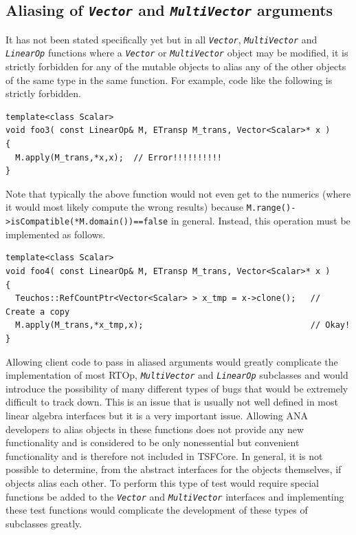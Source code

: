 %
\subsection{Aliasing of {}\texttt{\textit{Vector}} and {}\texttt{\textit{Multi\-Vector}} arguments}
\label{tsfcore:sec:aliasing}
%

It has not been stated specifically yet but in all
{}\texttt{\textit{Vector}}, {}\texttt{\textit{Multi\-Vector}} and
{}\texttt{\textit{LinearOp}} functions where a
{}\texttt{\textit{Vector}} or {}\texttt{\textit{Multi\-Vector}} object
may be modified, it is strictly forbidden for any of the mutable
objects to alias any of the other objects of the same type in the same
function.  For example, code like the following is strictly forbidden.

{\scriptsize\begin{verbatim}
template<class Scalar>
void foo3( const LinearOp& M, ETransp M_trans, Vector<Scalar>* x )
{
  M.apply(M_trans,*x,x);  // Error!!!!!!!!!!
}
\end{verbatim}}

{}\noindent{}Note that typically the above function would not even get
to the numerics (where it would most likely compute the wrong results)
because {}\texttt{M.range()->isCompatible(*M.domain())==false} in
general.  Instead, this operation must be implemented as follows.

{\scriptsize\begin{verbatim}
template<class Scalar>
void foo4( const LinearOp& M, ETransp M_trans, Vector<Scalar>* x )
{
  Teuchos::RefCountPtr<Vector<Scalar> > x_tmp = x->clone();   // Create a copy
  M.apply(M_trans,*x_tmp,x);                                  // Okay!
}
\end{verbatim}}

{}\noindent{}Allowing client code to pass in aliased arguments would
greatly complicate the implementation of most RTOp,
{}\texttt{\textit{Multi\-Vector}} and {}\texttt{\textit{LinearOp}}
subclasses and would introduce the possibility of many different types
of bugs that would be extremely difficult to track down.  This is an
issue that is usually not well defined in most linear algebra
interfaces but it is a very important issue.  Allowing ANA developers
to alias objects in these functions does not provide any new
functionality and is considered to be only nonessential but convenient
functionality and is therefore not included in TSFCore.  In general,
it is not possible to determine, from the abstract interfaces for the
objects themselves, if objects alias each other.  To perform this type
of test would require special functions be added to the
{}\texttt{\textit{Vector}} and {}\texttt{\textit{Multi\-Vector}}
interfaces and implementing these test functions would complicate the
development of these types of subclasses greatly.

